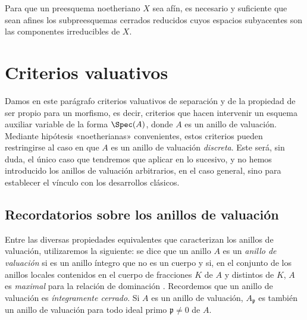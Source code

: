 \documentclass[oneside,10pt]{amsart}
\let\EGAOriginalLabel\label
\renewcommand{\label}[1]{\phantomsection\EGAOriginalLabel{#1}}
\begin{document}
\begin{corollary}[6.7.3]
\label{II.6.7.3}
Para que un preesquema noetheriano $X$ sea afín, es necesario y suficiente que sean afines los subpreesquemas cerrados reducidos cuyos espacios subyacentes son las componentes irreducibles de $X$.
\end{corollary}

\section{Criterios valuativos}
\label{section:II.7}

Damos en este parágrafo criterios valuativos de separación y de la propiedad de ser propio para un morfismo, es decir, criterios que hacen intervenir un esquema auxiliar variable de la forma $\Spec(A)$, donde $A$ es un anillo de valuación.
Mediante hipótesis «noetherianas» convenientes, estos criterios pueden restringirse al caso en que $A$ es un anillo de valuación \emph{discreta}.
Este será, sin duda, el único caso que tendremos que aplicar en lo sucesivo, y no hemos introducido los anillos de valuación arbitrarios, en el caso general, sino para establecer el vínculo con los desarrollos clásicos.

\subsection{Recordatorios sobre los anillos de valuación}
\label{subsection:II.7.1}

\begin{env}[7.1.1]
\label{II.7.1.1}
Entre las diversas propiedades equivalentes que caracterizan los anillos de valuación, utilizaremos la siguiente:
se dice que un anillo $A$ es un \emph{anillo de valuación} si es un anillo íntegro que no es un cuerpo y si, en el conjunto de los anillos locales contenidos en el cuerpo de fracciones $K$ de $A$ y distintos de $K$, $A$ es \emph{maximal} para la relación de dominación .
Recordemos que un anillo de valuación es \emph{íntegramente cerrado}.
Si $A$ es un anillo de valuación, $A_\mathfrak{p}$ es también un anillo de valuación para todo ideal primo $\mathfrak{p}\neq0$ de $A$.
\end{env}
\end{document}

